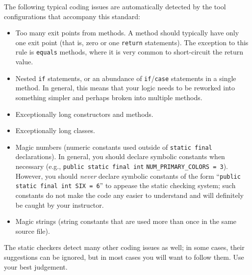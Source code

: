 The following typical coding issues are automatically detected by the
tool configurations that accompany this standard:
%
\begin{itemize}
\item Too many exit points from methods. A method should typically
  have only one exit point (that is, zero or one \texttt{return}
  statements). The exception to this rule is \texttt{equals} methods,
  where it is very common to short-circuit the return value.
\item Nested \texttt{if} statements, or an abundance of
  \texttt{if}/\texttt{case} statements in a single method. In general,
  this means that your logic needs to be reworked into something
  simpler and perhaps broken into multiple methods.
\item Exceptionally long constructors and methods.
\item Exceptionally long classes. 
\item Magic numbers (numeric constants used outside of \texttt{static
    final} declarations). In general, you should declare symbolic
  constants when necessary (e.g., \texttt{public static final int}
  \texttt{NUM\_PRIMARY\_COLORS = 3}). However, you should \emph{never}
  declare symbolic constants of the form ``\texttt{public static final
    int SIX = 6}'' to appease the static checking system; such constants
  do not make the code any easier to understand and will definitely be
  caught by your instructor.
\item Magic strings (string constants that are used more than once in
  the same source file).
\end{itemize}

The static checkers detect many other coding issues as well; in some
cases, their suggestions can be ignored, but in most cases you will
want to follow them. Use your best judgement.
